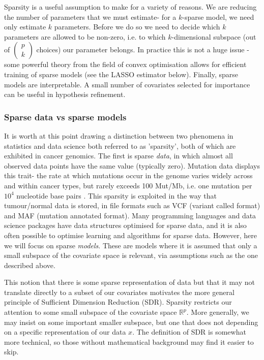 \documentclass[thesis.tex]{subfiles}
\begin{document}
Sparsity is a useful assumption to make for a variety of reasons. We are reducing the number of parameters that we must estimate- for a $k$-sparse model, we need only estimate $k$ parameters. Before we do so we need to decide which $k$ parameters are allowed to be non-zero, i.e. to which $k$-dimensional subspace (out of $\begin{pmatrix} p \\ k \end{pmatrix}$ choices) our parameter belongs. In practice this is not a huge issue - some powerful theory from the field of convex optimisation allows for efficient training of sparse models (see the LASSO estimator below). Finally, sparse models are interpretable. A small number of covariates selected for importance can be useful in hypothesis refinement.

\subsubsection{Sparse data vs sparse models}
It is worth at this point drawing a distinction between two phenomena in statistics and data science both referred to as 'sparsity', both of which are exhibited in cancer genomics. The first is sparse \textit{data}, in which almost all observed data points have the same value (typically zero). Mutation data displays this trait- the rate at which mutations occur in the genome varies widely across and within cancer types, but rarely exceeds 100 Mut/Mb, i.e. one mutation per $10^4$ nucleotide base pairs \citep{chalmers_analysis_2017}. This sparsity is exploited in the way that tumour/normal  data is stored, in file formats such as VCF (variant called format) and MAF (mutation annotated format). Many programming languages and data science packages have data structures optimised for sparse data, and it is also often possible to optimise learning and algorithms for sparse data. However, here we will focus on sparse \textit{models}. These are models where it is assumed that only a small subspace of the covariate space is relevant, via assumptions such as the one described above. 

This notion that there is some sparse representation of data but that it may not translate directly to a subset of our covariates motivates the more general principle of Sufficient Dimension Reduction (SDR). Sparsity restricts our attention to some small subspace of the covariate space $\mathbb{R}^p$. More generally, we may insist on some important smaller subspace, but one that does not depending on a specific representation of our data $x$. The definition of SDR is somewhat more technical, so those without mathematical background may find it easier to skip.\\~\\
\end{document}
